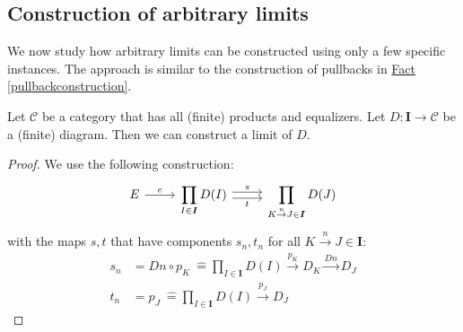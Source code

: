 \subsection{Construction of arbitrary limits}
\label{arbitrarylimits}
We now study how arbitrary limits can be constructed using only a
few specific instances.
The approach is similar to the construction of pullbacks in
\hyperref[pullbackconstruction]{Fact \ref*{pullbackconstruction}}.

\begin{theorem}
  \label{arbitrarylimits}
  Let $\mathscr C$ be a category that has all (finite) products and equalizers.
  Let $D : \bm I \to \mathscr C$ be a (finite) diagram.
  Then we can construct a limit of $D$.
\end{theorem}
\begin{proof}
We use the following construction:
\[
  \begin{tikzcd}
    E \arrow{r}{e} &
    \displaystyle \prod_{I \in \bm{I}} D(I)
    \arrow[r,shift left, "s"] \arrow[r,shift right,swap,"t"] &
    \displaystyle \prod_{K \overset{n}{\to} J \in \bm{I}} D(J)
  \end{tikzcd}
\]
with the maps $s, t$ that have components $s_n, t_n$ for all $K \overset{n}{\to} J \in \bm{I}$:
\begin{align*}
  s_n &= Dn \circ p_K\ \hat{=} \prod_{I \in \bm{I}} D(I)
        \overset{p_K}{\rightarrow} D_K \overset{Dn}{\rightarrow} D_J \\
  t_n &= p_J\ \hat{=} \prod_{I \in \bm{I}} D(I)
        \overset{p_J}{\rightarrow} D_J
\end{align*}


\end{proof}
